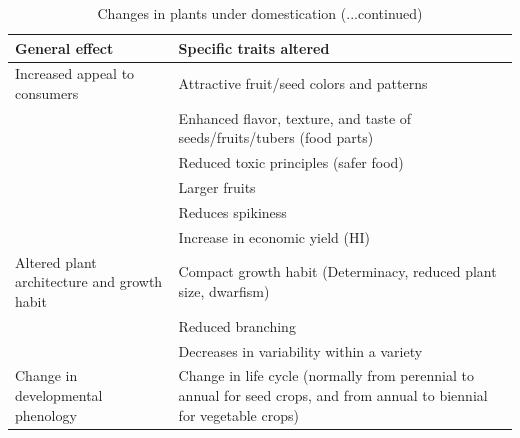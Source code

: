 \documentclass[ignorenonframetext,aspectratio=169]{beamer}
\begin{document}
\begin{frame}{}
\protect\hypertarget{section-4}{}

\begin{table}[t]

\caption{\label{tab:domestication-syndrome2}Changes in plants under domestication (...continued)}
\centering
\fontsize{6}{8}\selectfont
\begin{tabular}{>{\raggedright\arraybackslash}p{16em}>{\raggedright\arraybackslash}p{40em}}
\toprule
General effect & Specific traits altered\\
\midrule
\rowcolor{gray!6}  Increased appeal to consumers & Attractive fruit/seed colors and patterns\\
 & Enhanced flavor, texture, and taste of seeds/fruits/tubers (food parts)\\
\rowcolor{gray!6}   & Reduced toxic principles (safer food)\\
 & Larger fruits\\
\rowcolor{gray!6}   & Reduces spikiness\\
\addlinespace
 & Increase in economic yield (HI)\\
\rowcolor{gray!6}  Altered plant architecture and growth habit & Compact growth habit (Determinacy, reduced plant size, dwarfism)\\
 & Reduced branching\\
\rowcolor{gray!6}   & Decreases in variability within a variety\\
Change in developmental phenology & Change in life cycle (normally from perennial to annual for seed crops, and from annual to biennial for vegetable crops)\\
\bottomrule
\end{tabular}
\end{table}

\end{frame}
\end{document}
